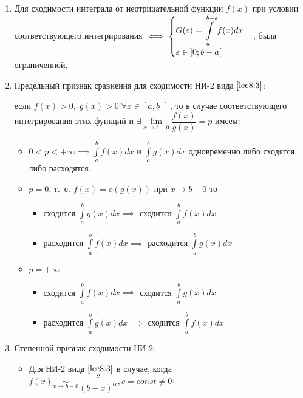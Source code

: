 \documentclass[../../main.tex]{subfiles}
\begin{document}
\begin{enumerate}
 \item Для сходимости интеграла от неотрицательной функции $f(x)$ при 
 условии соответствующего интегрирования $\iff \begin{cases}
 G(\varepsilon) = \displaystyle\int\limits_{a}^{b - \varepsilon}f(x)dx\\
 \varepsilon \in \left]0; b - a\right[
 \end{cases}$, была ограниченной.
 
 \item Предельный признак сравнения для сходимости НИ-2 вида 
 $\eqref{lec8:3}$:
 
 если $f(x) > 0,\; g(x) > 0\; \forall x \in \left[a, b\right[$, то в случае 
 соответствующего интегрирования этих функций и $\exists \underset{x \to b - 
 0}\lim\dfrac{f(x)}{g(x)} = p$ имеем:
 \begin{itemize}
  \item[а)] $0 < p < +\infty \implies \displaystyle\int\limits_{a}^{b}f(x)dx$ 
  и $\displaystyle\int\limits_{a}^{b}g(x)dx$ одновременно либо сходятся, либо 
  расходятся.
  \item[б)] $p = 0$, т.~е. $f(x) = o(g(x))$ при $x \to b - 0$ то
  \begin{itemize}
   \item сходится $\displaystyle\int\limits_{a}^{b}g(x)dx \implies $ 
   сходится $\displaystyle\int\limits_{a}^{b}f(x)dx$
   \item расходится $\displaystyle\int\limits_{a}^{b}f(x)dx \implies $ 
   расходится $\displaystyle\int\limits_{a}^{b}g(x)dx$
  \end{itemize}
  \item[в)] $p = +\infty$
    \begin{itemize}
     \item сходится $\displaystyle\int\limits_{a}^{b}f(x)dx \implies $ 
     сходится $\displaystyle\int\limits_{a}^{b}g(x)dx$
     \item расходится $\displaystyle\int\limits_{a}^{b}g(x)dx \implies $ 
     сходится $\displaystyle\int\limits_{a}^{b}f(x)dx$
    \end{itemize}
 \end{itemize}
 \item Степенной признак сходимости НИ-2:
 \begin{itemize}
 \item Для НИ-2 вида $\eqref{lec8:3}$ в случае, когда $f(x) 
 \underset{x \to b - 0}\sim \dfrac{c}{(b - x)^ {\alpha}}, c = const \neq 0$:


\end{itemize}
\end{enumerate}
\end{document}
